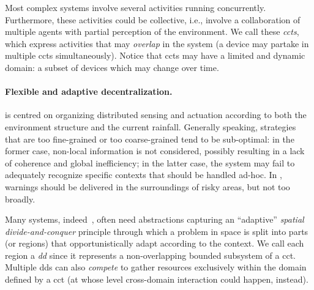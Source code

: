 Most complex systems
involve several activities running concurrently.
%
Furthermore,
these activities could be collective, i.e.,
involve a collaboration of multiple agents with partial perception of the environment.
We call these \emph{\acp{cct}},
 which express activities that
 may \emph{overlap} in the system
 (a device may partake in multiple \acp{cct} simultaneously).
%
Notice that \acp{cct} may 
 have a limited and dynamic domain:
 a subset of devices %
 which may change over time.

\paragraph{ Flexible and adaptive decentralization.} 
%
\casename{}
is centred on organizing distributed sensing and actuation
according to both the environment structure and the current rainfall.
%
Generally speaking, 
 strategies that are too fine-grained or too coarse-grained tend to be sub-optimal:
 in the former case,
non-local information is not considered,
possibly resulting in a lack of coherence and global inefficiency;
 in the latter case, 
 the system may fail to adequately recognize 
 specific contexts that should be handled ad-hoc.
%
In \casename{}, 
 warnings should be delivered 
 in the surroundings of risky areas,
 but not too broadly.

Many systems, indeed~\cite{DBLP:journals/fgcs/PianiniCVN21},
often need abstractions capturing an ``adaptive''
\emph{spatial divide-and-conquer}
principle through which a problem in space
is split into parts (or regions)
that
opportunistically adapt according to the context.
We call each region a \emph{\ac{dd}} since it represents a non-overlapping bounded subsystem of a \ac{cct}.
%
Multiple \acp{dd} can also \emph{compete} to gather resources exclusively within the domain defined by a \ac{cct}
(at whose level cross-domain interaction could happen, instead).

%

